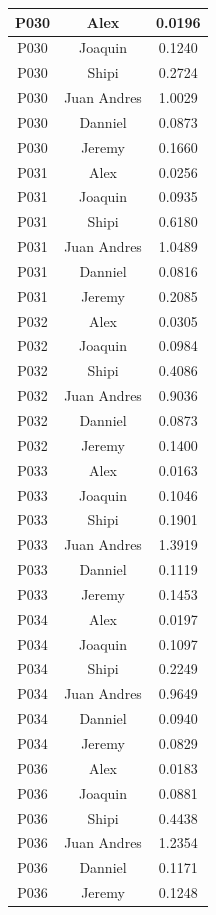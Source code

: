 \begin{longtable}{|c|c|c|}
    P030 & Alex        & 0.0196 \\ \hline
    P030 & Joaquin     & 0.1240 \\ \hline
    P030 & Shipi       & 0.2724 \\ \hline
    P030 & Juan Andres & 1.0029 \\ \hline
    P030 & Danniel     & 0.0873 \\ \hline
    P030 & Jeremy      & 0.1660 \\ \hline

    P031 & Alex        & 0.0256 \\ \hline
    P031 & Joaquin     & 0.0935 \\ \hline
    P031 & Shipi       & 0.6180 \\ \hline
    P031 & Juan Andres & 1.0489 \\ \hline
    P031 & Danniel     & 0.0816 \\ \hline
    P031 & Jeremy      & 0.2085 \\ \hline

    P032 & Alex        & 0.0305 \\ \hline
    P032 & Joaquin     & 0.0984 \\ \hline
    P032 & Shipi       & 0.4086 \\ \hline
    P032 & Juan Andres & 0.9036 \\ \hline
    P032 & Danniel     & 0.0873 \\ \hline
    P032 & Jeremy      & 0.1400 \\ \hline

    P033 & Alex        & 0.0163 \\ \hline
    P033 & Joaquin     & 0.1046 \\ \hline
    P033 & Shipi       & 0.1901 \\ \hline
    P033 & Juan Andres & 1.3919 \\ \hline
    P033 & Danniel     & 0.1119 \\ \hline
    P033 & Jeremy      & 0.1453 \\ \hline

    P034 & Alex        & 0.0197 \\ \hline
    P034 & Joaquin     & 0.1097 \\ \hline
    P034 & Shipi       & 0.2249 \\ \hline
    P034 & Juan Andres & 0.9649 \\ \hline
    P034 & Danniel     & 0.0940 \\ \hline
    P034 & Jeremy      & 0.0829 \\ \hline

    P036 & Alex        & 0.0183 \\ \hline
    P036 & Joaquin     & 0.0881 \\ \hline
    P036 & Shipi       & 0.4438 \\ \hline
    P036 & Juan Andres & 1.2354 \\ \hline
    P036 & Danniel     & 0.1171 \\ \hline
    P036 & Jeremy      & 0.1248 \\ \hline

\end{longtable}

